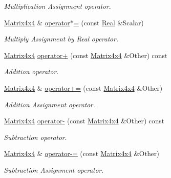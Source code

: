 \begin{DoxyCompactItemize}
\begin{DoxyCompactList}\small\item\em Multiplication Assignment operator. \item\end{DoxyCompactList}\item 
\hyperlink{classMezzanine_1_1Matrix4x4}{Matrix4x4} \& \hyperlink{classMezzanine_1_1Matrix4x4_ab17c9eddca23436dad038a5472fc57ef}{operator$\ast$=} (const \hyperlink{namespaceMezzanine_a726731b1a7df72bf3583e4a97282c6f6}{Real} \&Scalar)
\begin{DoxyCompactList}\small\item\em Multiply Assignment by Real operator. \item\end{DoxyCompactList}\item 
\hyperlink{classMezzanine_1_1Matrix4x4}{Matrix4x4} \hyperlink{classMezzanine_1_1Matrix4x4_ab999ad70d1c48ddf79a86101411e845c}{operator+} (const \hyperlink{classMezzanine_1_1Matrix4x4}{Matrix4x4} \&Other) const 
\begin{DoxyCompactList}\small\item\em Addition operator. \item\end{DoxyCompactList}\item 
\hyperlink{classMezzanine_1_1Matrix4x4}{Matrix4x4} \& \hyperlink{classMezzanine_1_1Matrix4x4_a006856d4b726dfd14b5c8205bfc9da2d}{operator+=} (const \hyperlink{classMezzanine_1_1Matrix4x4}{Matrix4x4} \&Other)
\begin{DoxyCompactList}\small\item\em Addition Assignment operator. \item\end{DoxyCompactList}\item 
\hyperlink{classMezzanine_1_1Matrix4x4}{Matrix4x4} \hyperlink{classMezzanine_1_1Matrix4x4_aefc5eaacbd32c66f47b46b6238486ee0}{operator-\/} (const \hyperlink{classMezzanine_1_1Matrix4x4}{Matrix4x4} \&Other) const 
\begin{DoxyCompactList}\small\item\em Subtraction operator. \item\end{DoxyCompactList}\item 
\hyperlink{classMezzanine_1_1Matrix4x4}{Matrix4x4} \& \hyperlink{classMezzanine_1_1Matrix4x4_a10908beb3a751d7a7e892114889d5e70}{operator-\/=} (const \hyperlink{classMezzanine_1_1Matrix4x4}{Matrix4x4} \&Other)
\begin{DoxyCompactList}\small\item\em Subtraction Assignment operator. \item\end{DoxyCompactList}\item 

\end{DoxyCompactItemize}
